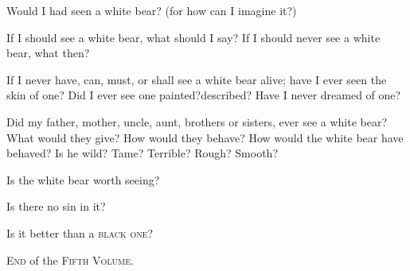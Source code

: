 \documentclass[twoside]{article}
\begin{document}
Would I had seen a white bear? (for how can I imagine it?)

If I should see a white bear, what\break
should I say? If I should
never see a white bear, what then?

If I never have, can, must, or shall see a white bear alive;
have I ever seen the skin of one? Did I ever see one
painted?\tsk described? Have I never dreamed of one?

Did my father, mother, uncle, aunt, brothers or sisters, ever
see a white bear? What would they give? How would\break
they behave? How would the white\break
bear have behaved? Is he wild?\break
Tame? Terrible? Rough? Smooth?

\tsk Is the white bear worth seeing?\tsk

\tsk Is there no sin in it?\tsk

Is it better than a \textsc{black one}?

\vfill
\centerline{\textsc{End} of the \textsc{Fifth Volume}.}
\vfill
\end{document}
